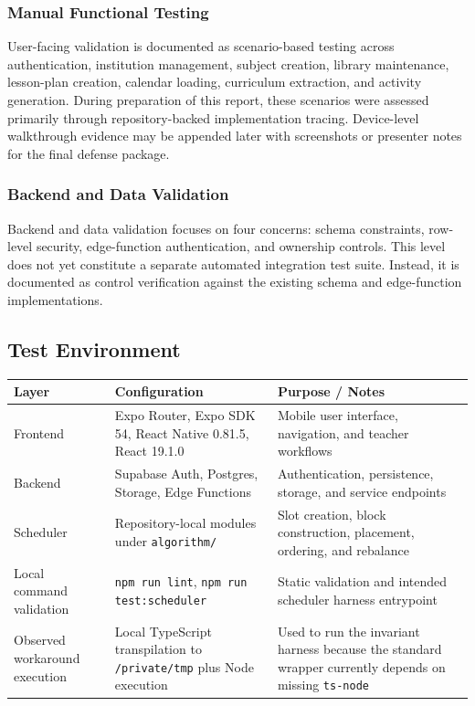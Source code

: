 \documentclass[12pt]{article}
\begin{document}
\subsubsection{Manual Functional Testing}

User-facing validation is documented as scenario-based testing across authentication, institution management, subject creation, library maintenance, lesson-plan creation, calendar loading, curriculum extraction, and activity generation. During preparation of this report, these scenarios were assessed primarily through repository-backed implementation tracing. Device-level walkthrough evidence may be appended later with screenshots or presenter notes for the final defense package.

\subsubsection{Backend and Data Validation}

Backend and data validation focuses on four concerns: schema constraints, row-level security, edge-function authentication, and ownership controls. This level does not yet constitute a separate automated integration test suite. Instead, it is documented as control verification against the existing schema and edge-function implementations.

\subsection{Test Environment}

\begin{longtable}{|L{3.2cm}|L{5.3cm}|L{6cm}|}
\hline
\textbf{Layer} & \textbf{Configuration} & \textbf{Purpose / Notes} \\
\hline
Frontend & Expo Router, Expo SDK 54, React Native 0.81.5, React 19.1.0 & Mobile user interface, navigation, and teacher workflows \\
\hline
Backend & Supabase Auth, Postgres, Storage, Edge Functions & Authentication, persistence, storage, and service endpoints \\
\hline
Scheduler & Repository-local modules under \nolinkurl{algorithm/} & Slot creation, block construction, placement, ordering, and rebalance \\
\hline
Local command validation & \texttt{npm run lint}, \texttt{npm run test:scheduler} & Static validation and intended scheduler harness entrypoint \\
\hline
Observed workaround execution & Local TypeScript transpilation to \nolinkurl{/private/tmp} plus Node execution & Used to run the invariant harness because the standard wrapper currently depends on missing \texttt{ts-node} \\
\hline
\end{longtable}
\end{document}
